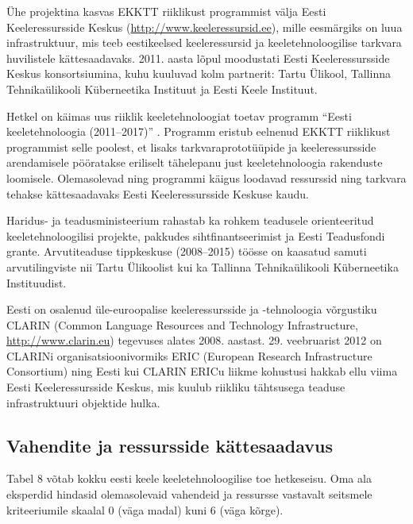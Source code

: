 \begin{multicols}{2}
Ühe projektina kasvas EKKTT riiklikust programmist välja Eesti
Keeleressursside Keskus (\url{http://www.keeleressursid.ee}), mille
eesmärgiks on luua infrastruktuur, mis teeb eestikeelsed
keeleressursid ja keeletehnoloogilise tarkvara huvilistele
kättesaadavaks. 2011. aasta lõpul moodustati Eesti Keeleressursside
Keskus konsortsiumina, kuhu kuuluvad kolm partnerit: Tartu Ülikool,
Tallinna Tehnikaülikooli Küberneetika Instituut ja Eesti Keele
Instituut. 

Hetkel on käimas uus riiklik keeletehnoloogiat toetav programm ``Eesti keeletehnoloogia (2011--2017)'' \cite{ekktt2}. 
Programm eristub eelnenud EKKTT riiklikust programmist selle poolest, et lisaks tarkvaraprototüüpide ja keeleressursside arendamisele pööratakse eriliselt tähelepanu just keeletehnoloogia rakenduste loomisele. Olemasolevad ning programmi käigus loodavad ressurssid ning tarkvara tehakse kättesaadavaks Eesti Keeleressursside Keskuse kaudu.

Haridus- ja teadusministeerium rahastab ka rohkem  teadusele orienteeritud keele\-tehnoloogilisi projekte, pakkudes siht\-finant\-seerimist ja Eesti Teadusfondi grante. 
Arvutiteaduse tippkeskuse (2008--2015) töösse on kaasatud samuti arvutilingviste  nii Tartu Ülikoolist kui ka Tallinna Tehnika\-ülikooli Küberneetika Instituudist.

Eesti on osalenud üle-euroopalise keeleressursside ja -tehnoloogia võrgustiku CLARIN (Common Language Resources and Technology Infrastructure, \url{http://www.clarin.eu}) tegevuses alates 2008. aastast. 29. veebruarist 2012 on CLARINi organisatsioonivormiks ERIC (European Research Infrastructure Consortium) ning Eesti kui CLARIN ERICu liikme kohustusi hakkab ellu viima Eesti Keeleressursside Keskus, mis kuulub riikliku tähtsusega teaduse infrastruktuuri objektide hulka.

\subsection{Vahendite ja ressursside kättesaadavus}

Tabel 8 võtab kokku eesti keele keeletehnoloogilise toe hetkeseisu. 
Oma ala eksperdid hindasid olemasolevaid vahendeid ja ressursse vastavalt seitsmele kriteeriumile skaalal 0 (väga madal) kuni 6 (väga kõrge). 


\end{multicols}
